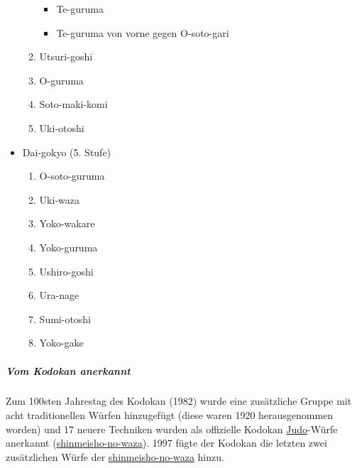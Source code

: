 \documentclass[justified, a4paper, notitlepage, captions=tableheading, nobib]{tufte-handout}
\begin{document}
\begin{itemize}
\begin{enumerate}
\begin{itemize}
\item Te-guruma
\item Te-guruma von vorne gegen O-soto-gari
\end{itemize}
\item Utsuri-goshi
\item O-guruma
\item Soto-maki-komi
\item Uki-otoshi
\end{enumerate}
\item Dai-gokyo (5. Stufe)
\begin{enumerate}
\item O-soto-guruma
\item Uki-waza
\item Yoko-wakare
\item Yoko-guruma
\item Ushiro-goshi
\item Ura-nage
\item Sumi-otoshi
\item Yoko-gake
\end{enumerate}
\end{itemize}

\subparagraph{Vom Kodokan anerkannt}
\label{sec:orga1e8a48}
Zum 100sten Jahrestag des Kodokan (1982) wurde eine zusätzliche Gruppe mit acht traditionellen Würfen hinzugefügt (diese waren 1920 herausgenommen worden) und 17 neuere Techniken wurden als offizielle Kodokan \hyperref[org39a3ee2]{Judo}-Würfe anerkannt (\hyperref[orge24b670]{shinmeisho-no-waza}). 1997 fügte der Kodokan die letzten zwei zusätzlichen Würfe der \hyperref[orge24b670]{shinmeisho-no-waza} hinzu.
\end{document}
